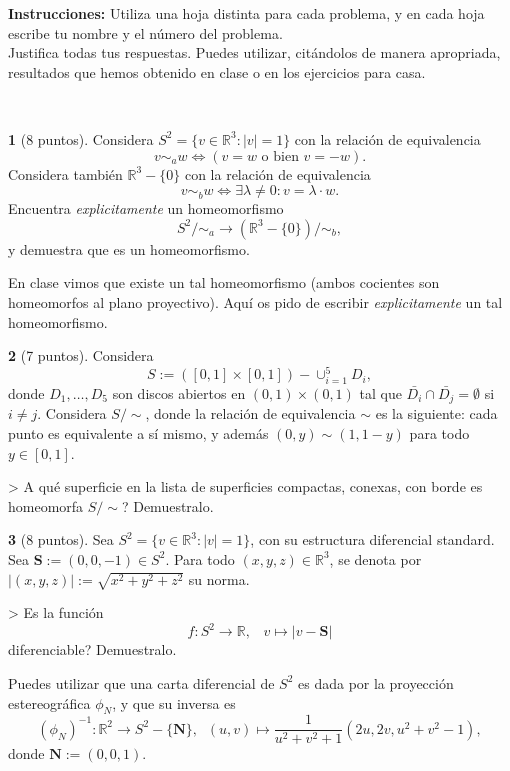 \documentclass[12pt,a4paper]{report}
\theoremstyle{definition}
\newtheorem{ex}{}
\newcommand{\RR}{\ensuremath{\mathbb R}}
\begin{document}
\noindent
\textsf{{\bf \sffamily  Instrucciones:} Utiliza una hoja distinta para 
cada problema, y en cada hoja escribe  tu nombre y el n\'umero del problema.\\
Justifica todas tus respuestas.
Puedes utilizar, cit\'andolos de manera apropriada, resultados que hemos obtenido en clase o en los ejercicios para casa.    \vspace{-2mm}}

 
\noindent
\hrulefill{}\\

 
\begin{ex}[8 puntos]    
Considera $S^2=\{v\in \RR^3: |v|=1\}$  con la relaci\'on de equivalencia $$v\sim_a w \Leftrightarrow (v=w \text{ o bien } v=-w).$$
Considera tambi\'en  $\RR^3-\{0\}$ con la relaci\'on de equivalencia $$v\sim_b w \Leftrightarrow \exists \lambda \neq 0: v=\lambda \cdot  w.$$
Encuentra \emph{explicitamente} un homeomorfismo $$S^2/\sim_a \to (\RR^3-\{0\})/\sim_b,$$ y demuestra que es un homeomorfismo.

 En clase vimos que existe un tal homeomorfismo
(ambos cocientes son homeomorfos al plano proyectivo). Aqu\'i os pido de escribir \emph{explicitamente} un tal homeomorfismo.
\end{ex}

\begin{ex} [7 puntos]
Considera $$S:=([0,1]\times[0,1])-\cup_{i=1}^5 D_i,$$ donde  $D_1,\dots,D_5$ son  discos abiertos en  $(0,1)\times(0,1)$ tal que  $\bar{D_i}\cap \bar{D_j}=\emptyset$ si $i\neq j$. Considera 
$S/\sim$, donde la relaci\'on de equivalencia $\sim$ es la siguiente:  cada punto es equivalente a s\'i mismo, y adem\'as $(0,y)\sim (1,1-y)$ para todo $y\in [0,1]$. 

> A qu\'e superficie en la lista de superficies compactas, conexas, con borde es homeomorfa  $S/\sim$? Demuestralo.

\end{ex}
 

\begin{ex}  [8 puntos]
Sea $S^2=\{v\in \RR^3: |v|=1\}$, con su estructura   diferencial standard. Sea $\textbf{S}:=(0,0,-1)\in S^2$.
Para todo $(x,y,z)\in \RR^3$, se denota por $|(x,y,z)|:=\sqrt{x^2+y^2+z^2}$ su norma.

> Es la funci\'on
$$f \colon S^2\to \RR,  \;\;\; v\mapsto |v-\textbf{S}|$$
diferenciable? Demuestralo.

 Puedes utilizar que una carta diferencial de $S^2$ es dada por la proyecci\'on estereogr\'afica $\phi_N$, y que su inversa es $$(\phi_N)^{-1} \colon \RR^2 \to S^2-\{\textbf{N}\},\;\;(u,v)\mapsto \frac{1}{u^2+v^2+1}(2u,2v,u^2+v^2-1),$$
donde $\textbf{N}:=(0,0,1)$.

 
\end{ex}
\end{document}
